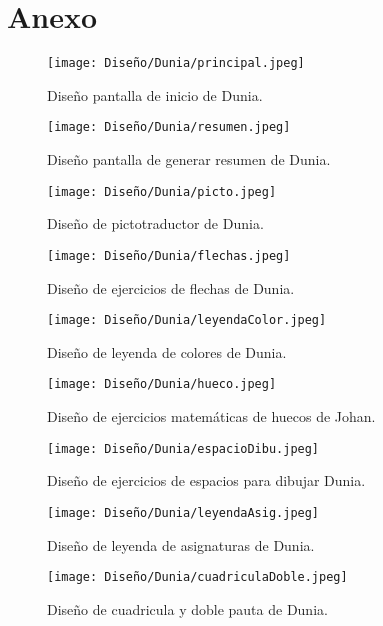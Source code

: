 \chapter{Anexo}
\label{cap:anexo}
\begin{figure}[ht!]
  \centering
  \texttt{[image: Diseño/Dunia/principal.jpeg]}
  \caption{Diseño pantalla de inicio de Dunia.}
  \label{dunia1}
\end{figure}

\begin{figure}[ht!]
  \centering
  \texttt{[image: Diseño/Dunia/resumen.jpeg]}
  \caption{Diseño pantalla de generar resumen de Dunia.}
  \label{dunia2}
\end{figure}

\begin{figure}[ht!]
  \centering
  \texttt{[image: Diseño/Dunia/picto.jpeg]}
  \caption{Diseño de pictotraductor de Dunia.}
  \label{dunia3}
\end{figure}

\begin{figure}[ht!]
  \centering
  \texttt{[image: Diseño/Dunia/flechas.jpeg]}
  \caption{Diseño de ejercicios de flechas de Dunia.}
  \label{dunia4}
\end{figure}

\begin{figure}[ht!]
  \centering
  \texttt{[image: Diseño/Dunia/leyendaColor.jpeg]}
  \caption{Diseño de leyenda de colores de Dunia.}
  \label{dunia5}
\end{figure}

\begin{figure}[ht!]
  \centering
  \texttt{[image: Diseño/Dunia/hueco.jpeg]}
  \caption{Diseño de ejercicios matemáticas de huecos de Johan.}
  \label{dunia6}
\end{figure}

\begin{figure}[ht!]
  \centering
  \texttt{[image: Diseño/Dunia/espacioDibu.jpeg]}
  \caption{Diseño de ejercicios de espacios para dibujar Dunia.}
  \label{dunia7}
\end{figure}

\begin{figure}[ht!]
  \centering
\texttt{[image: Diseño/Dunia/leyendaAsig.jpeg]}
  \caption{Diseño de leyenda de asignaturas de Dunia.}
  \label{dunia8}
\end{figure}

\begin{figure}[ht!]
  \centering
\texttt{[image: Diseño/Dunia/cuadriculaDoble.jpeg]}
  \caption{Diseño de cuadricula y doble pauta de Dunia.}
  
  \label{dunia9}
\end{figure}




